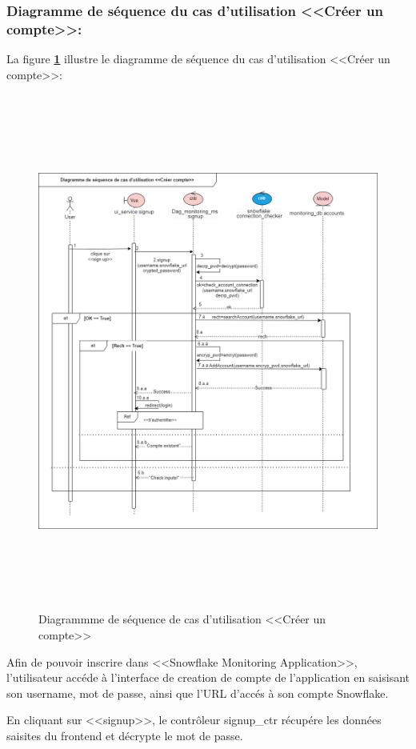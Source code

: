     \subsubsection{Diagramme de séquence du cas d'utilisation <<Créer un compte>>:}
    \par La figure \textbf{\ref*{fig:seq3}} illustre le diagramme de séquence du cas d'utilisation <<Créer un compte>>:
    \begin{figure}[H]
        \centering
        \includegraphics[width =1\linewidth, height=17cm]{img/conception/signup.png}
        \caption{Diagrammme de séquence de cas d'utilisation <<Créer un compte>> }
        \label{fig:seq3}
    \end{figure}
    \par Afin de pouvoir inscrire dans <<Snowflake Monitoring Application>>, l'utilisateur accéde à l'interface de creation de compte de l'application en saisisant son username, mot de passe, 
    ainsi que l'URL d'accés à son compte Snowflake.
    \par En cliquant sur <<signup>>, le contrôleur signup\_ctr récupére les données saisites du frontend et décrypte le mot de passe.
